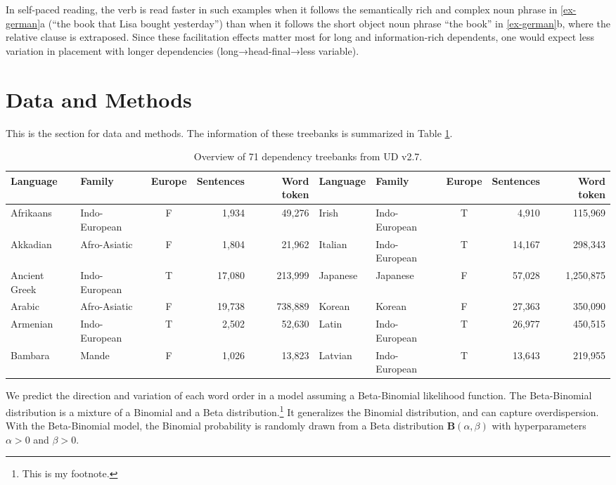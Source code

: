 \documentclass[
]{article}
\begin{document}
In self-paced reading, the verb is read faster in such examples when it
follows the semantically rich and complex noun phrase in
\ref{ex-german}a (``the book that Lisa bought yesterday'') than when it
follows the short object noun phrase ``the book'' in \ref{ex-german}b,
where the relative clause is extraposed. Since these facilitation
effects matter most for long and information-rich dependents, one would
expect less variation in placement with longer dependencies
(long→head-final→less variable).

\section{Data and Methods}\label{data-and-methods}

This is the section for data and methods. The information of these
treebanks is summarized in Table \ref{tab:UD-data}.

\begin{center}
\setlength\tabcolsep{2pt}
\begin{ThreePartTable}
\footnotesize
\begin{longtable}[h]{llcrr|llcrr}
\caption{Overview of 71 dependency treebanks from UD v2.7.\label{tab:UD-data}} \\
\hline
\endfirsthead
\toprule
\endhead
\vspace{-0.05cm}
Language & Family & Europe & Sentences & Word token & Language & Family & Europe & Sentences & Word token\\
\midrule
Afrikaans & Indo-European & F & 1,934 & 49,276 & Irish & Indo-European & T & 4,910 & 115,969\\
Akkadian & Afro-Asiatic & F & 1,804 & 21,962 & Italian & Indo-European & T & 14,167 & 298,343\\
Ancient Greek & Indo-European & T & 17,080 & 213,999 & Japanese & Japanese & F & 57,028 & 1,250,875\\
Arabic & Afro-Asiatic & F & 19,738 & 738,889 & Korean & Korean & F & 27,363 & 350,090\\
Armenian & Indo-European & T & 2,502 & 52,630 & Latin & Indo-European & T & 26,977 & 450,515\\
Bambara & Mande & F & 1,026 & 13,823 & Latvian & Indo-European & T & 13,643 & 219,955\\
\bottomrule
\end{longtable}
\end{ThreePartTable}
\end{center}

We predict the direction and variation of each word order in a model
assuming a Beta-Binomial likelihood function. The Beta-Binomial
distribution is a mixture of a Binomial and a Beta
distribution.\footnote{This is my footnote.} It generalizes the Binomial
distribution, and can capture overdispersion. With the Beta-Binomial
model, the Binomial probability is randomly drawn from a Beta
distribution \(\mathbf{B}\left(\alpha, \beta \right)\) with
hyperparameters \(\alpha > 0\) and \(\beta > 0\).
\end{document}
